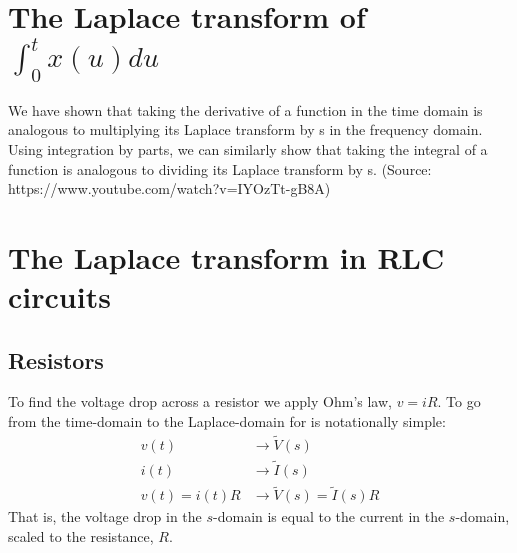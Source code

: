 \documentclass[11pt]{book}
\begin{document}
\section{The Laplace transform of $\int_{0}^{t} x(u) du$}

We have shown that taking the derivative of a function in the time domain is analogous to multiplying its Laplace transform by s in the frequency domain. Using integration by parts, we can similarly show that taking the integral of a function is analogous to dividing its Laplace transform by s. (Source: https://www.youtube.com/watch?v=IYOzTt-gB8A)




\section{The Laplace transform in RLC circuits}
\subsection{Resistors}
To find the voltage drop across a resistor we apply Ohm's law, $v = iR$. To go from the time-domain to the Laplace-domain for is notationally simple:
\begin{align}
	v(t) & \rightarrow \tilde{V}(s) \\
	i(t) & \rightarrow \tilde{I}(s) \\
	v(t) = i(t)R & \rightarrow \tilde{V}(s) = \tilde{I}(s)R
\end{align}
That is, the voltage drop in the $s$-domain is equal to the current in the $s$-domain, scaled to the resistance, $R$.
\end{document}
